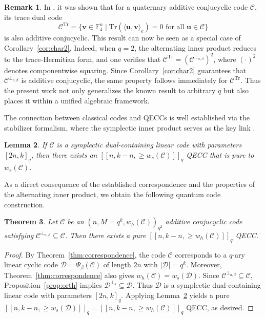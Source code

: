 \documentclass{aims}
\numberwithin{equation}{section}
\newtheorem{theorem}{Theorem}[section]
\newtheorem{lemma}[theorem]{Lemma}
\theoremstyle{definition}
\newtheorem{remark}[theorem]{Remark}
\newcommand{\F}{\mathbb{F}}
\newcommand{\Tr}{\mathrm{Tr}}
\begin{document}
\begin{remark}
	In \cite{abualrub2020}, it was shown that for a quaternary additive conjucyclic code $\mathcal{C}$, its trace dual code
	\[
	\mathcal{C}^{\mathrm{Tr}} = \{\mathbf{v} \in \F_4^n \mid \Tr(\langle \mathbf{u}, \mathbf{v} \rangle_e) = 0 \text{ for all } \mathbf{u} \in \mathcal{C}\}
	\]
	is also additive conjucyclic. This result can now be seen as a special case of Corollary~\ref{cor:char2}. Indeed, when $q = 2$, the alternating inner product reduces to the trace‑Hermitian form, and one verifies that $\mathcal{C}^{\mathrm{Tr}} = (\mathcal{C}^{\perp_{a,\beta}})^2$, where $(\cdot)^2$ denotes componentwise squaring. Since Corollary~\ref{cor:char2} guarantees that $\mathcal{C}^{\perp_{a,\beta}}$ is additive conjucyclic, the same property follows immediately for $\mathcal{C}^{\mathrm{Tr}}$. Thus the present work not only generalizes the known result to arbitrary $q$ but also places it within a unified algebraic framework.
\end{remark}

The connection between classical codes and QECCs is well established via the stabilizer formalism, where the symplectic inner product serves as the key link \cite{ashikhmin2001, ketkar2006}.



\begin{lemma}\cite{ashikhmin2001}\label{ss113r}
	If $\mathcal{C}$ is a symplectic dual-containing linear code with parameters $[2n,k]_q$, then there exists an $[[n,k-n,\ge w_s(\mathcal{C})]]_q$ QECC that is pure to $w_s(\mathcal{C})$.
\end{lemma}

As a direct consequence of the established correspondence and the properties of the alternating inner product, we obtain the following quantum code construction.
\begin{theorem}\label{thm:qeck}
	Let $\mathcal{C}$ be an $(n,M=q^k,w_h(\mathcal{C}))_{q^2}$ additive conjucyclic code satisfying $\mathcal{C}^{\perp_{a,\beta}} \subseteq \mathcal{C}$. Then there exists a pure $[[n,k-n,\ge w_h(\mathcal{C})]]_q$ QECC.
\end{theorem}
\begin{proof}
	By Theorem~\ref{thm:correspondence}, the code $\mathcal{C}$ corresponds to a $q$-ary linear cyclic code $\mathcal{D} = \Psi_\beta(\mathcal{C})$ of length $2n$ with $|\mathcal{D}| = q^k$. Moreover, Theorem~\ref{thm:correspondence} also gives $w_h(\mathcal{C}) = w_s(\mathcal{D})$. Since $\mathcal{C}^{\perp_{a,\beta}} \subseteq \mathcal{C}$, Proposition~\ref{prop:orth} implies $\mathcal{D}^{\perp_s} \subseteq \mathcal{D}$. Thus $\mathcal{D}$ is a symplectic dual-containing linear code with parameters $[2n,k]_q$. Applying Lemma~\ref{ss113r} yields a pure $[[n,k-n,\ge w_s(\mathcal{D})]]_q = [[n,k-n,\ge w_h(\mathcal{C})]]_q$ QECC, as desired.
\end{proof}
\end{document}
